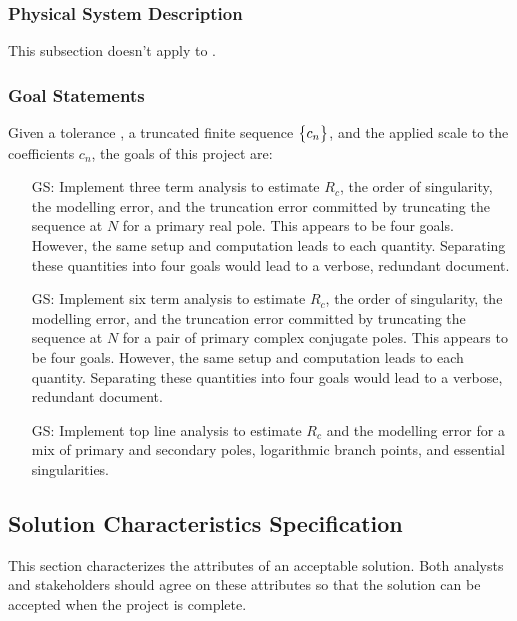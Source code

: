 \documentclass[12pt]{article}
\newcounter{goalnum} %
\begin{document}
\subsubsection{Physical System Description} \label{sec_phySystDescrip}

This subsection doesn't apply to .

\subsubsection{Goal Statements}\label{ssc:goal-statements}

\Ni Given a tolerance \tol, a truncated finite sequence $\bigl\{ {c_n} \bigr\}$, and the applied scale
to the coefficients $c_n$, the goals of this project are:

\begin{itemize}
\item[GS\refstepcounter{goalnum}\thegoalnum \label{G_3ta}:] Implement \cite{chang1982} three term analysis
to estimate $R_c$, the order of singularity, the modelling error, and the truncation error committed
by truncating the sequence at $N$ for a primary real pole. This appears to be four goals. However,
the same setup and computation leads to each quantity. Separating these quantities into four goals
would lead to a verbose, redundant document.

\item[GS\refstepcounter{goalnum}\thegoalnum \label{G_6ta}:] Implement \cite{chang1982} six term analysis
to estimate $R_c$, the order of singularity, the modelling error, and the truncation error committed
by truncating the sequence at $N$ for a pair of primary complex conjugate poles. This appears to be
four goals. However, the same setup and computation leads to each quantity. Separating these quantities
into four goals would lead to a verbose, redundant document.

\item[GS\refstepcounter{goalnum}\thegoalnum \label{G_topline}:] Implement \cite{chang1982} top line analysis
to estimate $R_c$ and the modelling error for a mix of primary and secondary poles,
logarithmic branch points, and essential singularities.
\end{itemize}

\subsection{Solution Characteristics Specification}

This section characterizes the attributes of an acceptable solution.
Both analysts and stakeholders should agree on these attributes
so that the solution can be accepted when the project is complete.
\end{document}
